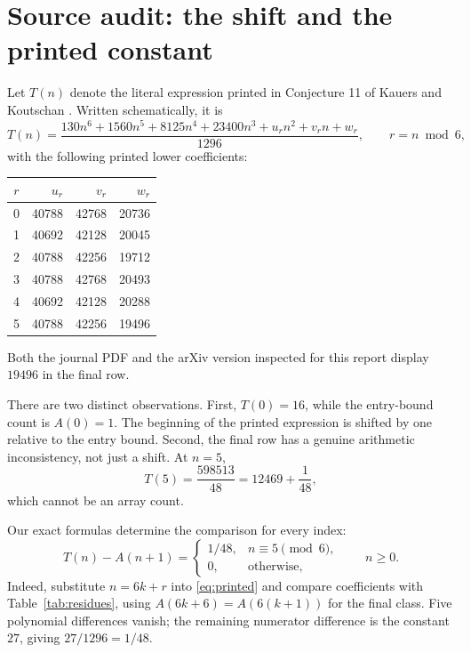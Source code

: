 \documentclass[11pt]{article}
\numberwithin{equation}{section}
\theoremstyle{definition}
\begin{document}
\section{Source audit: the shift and the printed constant}
\label{sec:source}

Let $T(n)$ denote the literal expression printed in Conjecture 11 of
Kauers and Koutschan \cite[p.~25]{kk}. Written schematically, it is
\begin{equation}\label{eq:printed}
 T(n)=\frac{130n^6+1560n^5+8125n^4+23400n^3
                 +u_rn^2+v_rn+w_r}{1296},
 \qquad r=n\bmod6,
\end{equation}
with the following printed lower coefficients:
\begin{center}
\begin{tabular}{crrr}
\toprule
$r$&$u_r$&$v_r$&$w_r$\\
\midrule
0&40788&42768&20736\\
1&40692&42128&20045\\
2&40788&42256&19712\\
3&40788&42768&20493\\
4&40692&42128&20288\\
5&40788&42256&19496\\
\bottomrule
\end{tabular}
\end{center}
Both the journal PDF and the arXiv version inspected for this report display
$19496$ in the final row.

There are two distinct observations. First, $T(0)=16$, while the entry-bound
count is $A(0)=1$. The beginning of the printed expression is shifted by one
relative to the entry bound. Second, the final row has a genuine arithmetic
inconsistency, not just a shift. At $n=5$,
\begin{equation}\label{eq:typo}
 T(5)=\frac{598513}{48}=12469+\frac1{48},
\end{equation}
which cannot be an array count.

Our exact formulas determine the comparison for every index:
\begin{equation}\label{eq:sourcecomparison}
 T(n)-A(n+1)=
 \begin{cases}
 1/48,&n\equiv5\pmod6,\\
 0,&\text{otherwise},
 \end{cases}
 \qquad n\geq0.
\end{equation}
Indeed, substitute $n=6k+r$ into \eqref{eq:printed} and compare coefficients
with Table~\ref{tab:residues}, using $A(6k+6)=A(6(k+1))$ for the final
class. Five polynomial differences vanish; the remaining numerator difference
is the constant $27$, giving $27/1296=1/48$.
\end{document}
